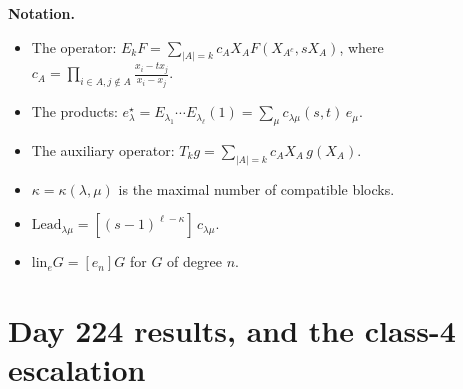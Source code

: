\documentclass[10pt]{article}
\newcommand{\lin}{\mathrm{lin}_e}
\newcommand{\Lead}{\mathrm{Lead}}
\begin{document}
\medskip\noindent\textbf{Notation.}
\begin{itemize}
\item The operator: $E_kF=\sum_{|A|=k}c_AX_AF(X_{A^c},sX_A)$, where $c_A=\prod_{i\in A,j\notin A}\frac{x_i-tx_j}{x_i-x_j}$.
\item The products: $e^\star_\lambda=E_{\lambda_1}\cdots E_{\lambda_\ell}(1)=\sum_\mu c_{\lambda\mu}(s,t)\,e_\mu$.
\item The auxiliary operator: $T_kg=\sum_{|A|=k}c_AX_A\,g(X_A)$.
\item $\kappa=\kappa(\lambda,\mu)$ is the maximal number of compatible blocks.
\item $\Lead_{\lambda\mu}=[(s-1)^{\ell-\kappa}]\,c_{\lambda\mu}$.
\item $\lin G=[e_n]G$ for $G$ of degree $n$.
\end{itemize}

\section{Day 224 results, and the class-4 escalation}
\end{document}
